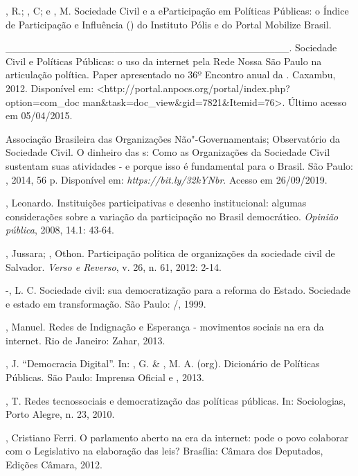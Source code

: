 \begin{Parskip}
, R.; , C; e , M. Sociedade Civil e a eParticipação
em Políticas Públicas: o Índice de Participação e Influência () do
Instituto Pólis e do Portal Mobilize Brasil.

\_\_\_\_\_\_\_\_\_\_\_\_\_\_\_\_\_\_\_\_\_\_\_\_\_\_\_\_\_\_\_\_\_\_\_\_\_\_\_.
Sociedade Civil e Políticas Públicas: o uso da internet pela Rede Nossa
São Paulo na articulação política. Paper apresentado no 36º Encontro
anual da . Caxambu, 2012. Disponível em:
\textless{}http://portal.anpocs.org/portal/index.php?option=com\_doc
man\&task=doc\_view\&gid=7821\&Itemid=76\textgreater{}. Último acesso em
05/04/2015.

Associação Brasileira das Organizações Não"-Governamentais; Observatório
da Sociedade Civil. O dinheiro das s: Como as Organizações da
Sociedade Civil sustentam suas atividades - e porque isso é fundamental
para o Brasil. São Paulo: , 2014, 56 p. Disponível em:
\emph{https://bit.ly/32kYNbr}.
Acesso em 26/09/2019.

, Leonardo. Instituições participativas e desenho institucional:
algumas considerações sobre a variação da participação no Brasil
democrático. \emph{Opinião pública}, 2008, 14.1: 43-64.

, Jussara; , Othon. Participação política de organizações
da sociedade civil de Salvador. \emph{Verso e Reverso}, v. 26, n. 61,
2012: 2-14.

-, L. C. Sociedade civil: sua democratização para a
reforma do Estado. Sociedade e estado em transformação. São Paulo:
/, 1999.

, Manuel. Redes de Indignação e Esperança - movimentos sociais
na era da internet. Rio de Janeiro: Zahar, 2013.

, J. ``Democracia Digital''. In: , G. \& , M. A.
(org). Dicionário de Políticas Públicas. São Paulo: Imprensa Oficial e
, 2013.

, T. Redes tecnossociais e democratização das políticas públicas.
In: Sociologias, Porto Alegre, n. 23, 2010.

, Cristiano Ferri. O parlamento aberto na era da internet: pode o
povo colaborar com o Legislativo na elaboração das leis? Brasília:
Câmara dos Deputados, Edições Câmara, 2012.


\end{Parskip}
